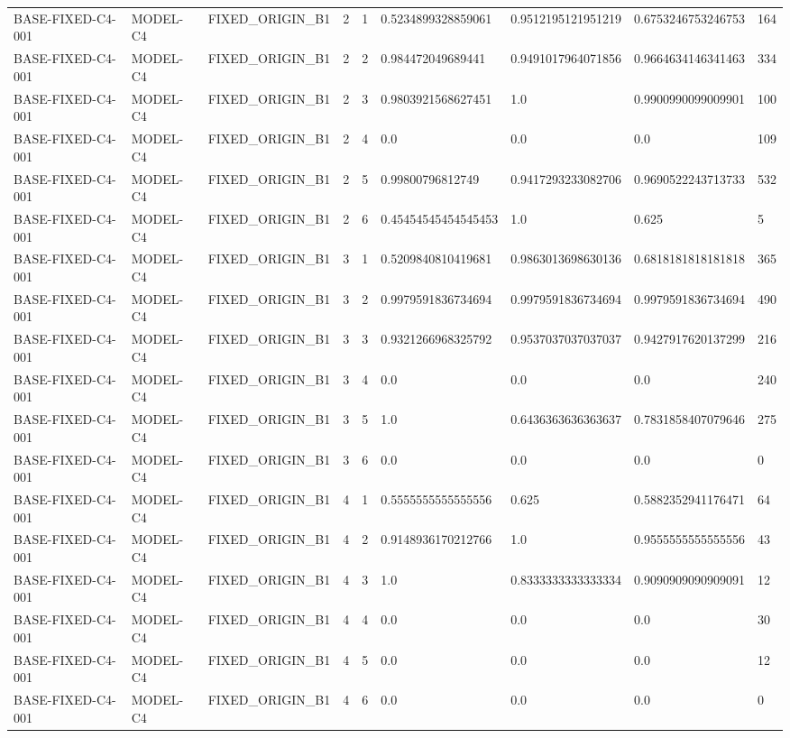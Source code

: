 \begin{tabular}{lllllllll}
BASE-FIXED-C4-001 & MODEL-C4 & FIXED\_ORIGIN\_B1 & 2 & 1 & 0.5234899328859061 & 0.9512195121951219 & 0.6753246753246753 & 164 \\
BASE-FIXED-C4-001 & MODEL-C4 & FIXED\_ORIGIN\_B1 & 2 & 2 & 0.984472049689441 & 0.9491017964071856 & 0.9664634146341463 & 334 \\
BASE-FIXED-C4-001 & MODEL-C4 & FIXED\_ORIGIN\_B1 & 2 & 3 & 0.9803921568627451 & 1.0 & 0.9900990099009901 & 100 \\
BASE-FIXED-C4-001 & MODEL-C4 & FIXED\_ORIGIN\_B1 & 2 & 4 & 0.0 & 0.0 & 0.0 & 109 \\
BASE-FIXED-C4-001 & MODEL-C4 & FIXED\_ORIGIN\_B1 & 2 & 5 & 0.99800796812749 & 0.9417293233082706 & 0.9690522243713733 & 532 \\
BASE-FIXED-C4-001 & MODEL-C4 & FIXED\_ORIGIN\_B1 & 2 & 6 & 0.45454545454545453 & 1.0 & 0.625 & 5 \\
BASE-FIXED-C4-001 & MODEL-C4 & FIXED\_ORIGIN\_B1 & 3 & 1 & 0.5209840810419681 & 0.9863013698630136 & 0.6818181818181818 & 365 \\
BASE-FIXED-C4-001 & MODEL-C4 & FIXED\_ORIGIN\_B1 & 3 & 2 & 0.9979591836734694 & 0.9979591836734694 & 0.9979591836734694 & 490 \\
BASE-FIXED-C4-001 & MODEL-C4 & FIXED\_ORIGIN\_B1 & 3 & 3 & 0.9321266968325792 & 0.9537037037037037 & 0.9427917620137299 & 216 \\
BASE-FIXED-C4-001 & MODEL-C4 & FIXED\_ORIGIN\_B1 & 3 & 4 & 0.0 & 0.0 & 0.0 & 240 \\
BASE-FIXED-C4-001 & MODEL-C4 & FIXED\_ORIGIN\_B1 & 3 & 5 & 1.0 & 0.6436363636363637 & 0.7831858407079646 & 275 \\
BASE-FIXED-C4-001 & MODEL-C4 & FIXED\_ORIGIN\_B1 & 3 & 6 & 0.0 & 0.0 & 0.0 & 0 \\
BASE-FIXED-C4-001 & MODEL-C4 & FIXED\_ORIGIN\_B1 & 4 & 1 & 0.5555555555555556 & 0.625 & 0.5882352941176471 & 64 \\
BASE-FIXED-C4-001 & MODEL-C4 & FIXED\_ORIGIN\_B1 & 4 & 2 & 0.9148936170212766 & 1.0 & 0.9555555555555556 & 43 \\
BASE-FIXED-C4-001 & MODEL-C4 & FIXED\_ORIGIN\_B1 & 4 & 3 & 1.0 & 0.8333333333333334 & 0.9090909090909091 & 12 \\
BASE-FIXED-C4-001 & MODEL-C4 & FIXED\_ORIGIN\_B1 & 4 & 4 & 0.0 & 0.0 & 0.0 & 30 \\
BASE-FIXED-C4-001 & MODEL-C4 & FIXED\_ORIGIN\_B1 & 4 & 5 & 0.0 & 0.0 & 0.0 & 12 \\
BASE-FIXED-C4-001 & MODEL-C4 & FIXED\_ORIGIN\_B1 & 4 & 6 & 0.0 & 0.0 & 0.0 & 0 \\

\end{tabular}
